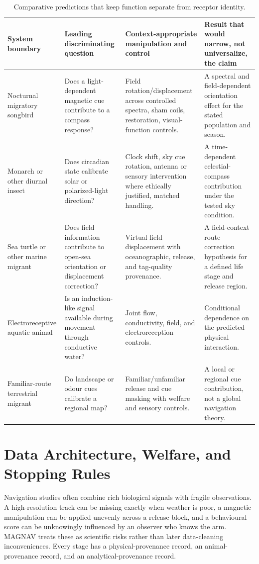 \documentclass[conference]{IEEEtran}
\begin{document}
\begin{table}[!t]
\caption{Comparative predictions that keep function separate from receptor identity.}\label{tab:comparative}\centering\footnotesize
\begin{tabular}{@{}L{.18\textwidth}L{.22\textwidth}L{.28\textwidth}L{.24\textwidth}@{}}\toprule
System boundary & Leading discriminating question & Context-appropriate manipulation and control & Result that would narrow, not universalize, the claim\\\midrule
Nocturnal migratory songbird & Does a light-dependent magnetic cue contribute to a compass response? & Field rotation/displacement across controlled spectra, sham coils, restoration, visual-function controls. & A spectral and field-dependent orientation effect for the stated population and season.\\
Monarch or other diurnal insect & Does circadian state calibrate solar or polarized-light direction? & Clock shift, sky cue rotation, antenna or sensory intervention where ethically justified, matched handling. & A time-dependent celestial-compass contribution under the tested sky condition.\\
Sea turtle or other marine migrant & Does field information contribute to open-sea orientation or displacement correction? & Virtual field displacement with oceanographic, release, and tag-quality provenance. & A field-context route correction hypothesis for a defined life stage and release region.\\
Electroreceptive aquatic animal & Is an induction-like signal available during movement through conductive water? & Joint flow, conductivity, field, and electroreception controls. & Conditional dependence on the predicted physical interaction.\\
Familiar-route terrestrial migrant & Do landscape or odour cues calibrate a regional map? & Familiar/unfamiliar release and cue masking with welfare and sensory controls. & A local or regional cue contribution, not a global navigation theory.\\\bottomrule
\end{tabular}
\end{table}

\section{Data Architecture, Welfare, and Stopping Rules}\label{sec:governance}
Navigation studies often combine rich biological signals with fragile observations. A high-resolution track can be missing exactly when weather is poor, a magnetic manipulation can be applied unevenly across a release block, and a behavioural score can be unknowingly influenced by an observer who knows the arm. MAGNAV treats these as scientific risks rather than later data-cleaning inconveniences. Every stage has a physical-provenance record, an animal-provenance record, and an analytical-provenance record.
\end{document}
